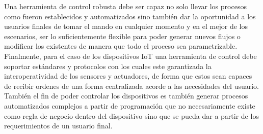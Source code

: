 Una herramienta de control robusta debe ser capaz no solo llevar los procesos como fueron establecidos y automatizados sino también dar la oportunidad a los usuarios finales de tomar el mando en cualquier momento y en el mejor de los escenarios, ser lo suficientemente flexible para poder generar nuevos flujos o modificar los existentes de manera que todo el proceso sea parametrizable.\\ 

Finalmente, para el caso de los dispositivos IoT una herramienta de control debe soportar estándares y protocolos con los cuales este garantizada la interoperatividad de los sensores y actuadores, de forma que estos sean capaces de recibir ordenes de una forma centralizada acorde a las necesidades del usuario. También el fin de poder controlar los dispositivos es también generar procesos automatizados complejos a partir de programación que no necesariamente existe como regla de negocio dentro del dispositivo sino que se pueda dar a partir de los requerimientos de un usuario final.  
